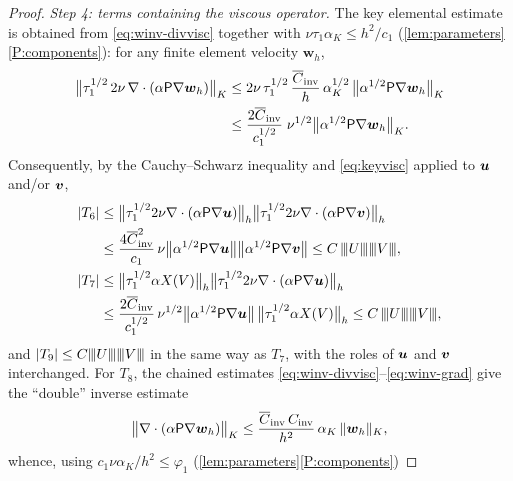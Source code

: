\begin{proof}
\medskip\noindent\emph{Step 4: terms containing the viscous operator.}
The key elemental estimate is obtained from \eqref{eq:winv-divvisc} together with
$\nu\tau_1\alpha_K\le h^2/c_1$ (\cref{lem:parameters}\ref{P:components}): for any finite
element velocity $\boldsymbol{w}_h$,
\begin{equation}\label{eq:keyvisc}
\begin{aligned}
  \bigl\lVert\tau_1^{1/2}\,2\nu\,
  \nabla\cdot(\alpha\mathsf{P}\nabla\boldsymbol{w}_h)\bigr\rVert_{K}
  &\le 2\nu\,\tau_1^{1/2}\,\frac{\overline{C}_{\mathrm{inv}}}{h}\,\alpha_K^{1/2}\,
  \bigl\lVert\alpha^{1/2}\mathsf{P}\nabla\boldsymbol{w}_h\bigr\rVert_{K} \\
  &\le \frac{2\overline{C}_{\mathrm{inv}}}{c_1^{1/2}}\;\nu^{1/2}
  \bigl\lVert\alpha^{1/2}\mathsf{P}\nabla\boldsymbol{w}_h\bigr\rVert_{K}.
\end{aligned}
\end{equation}
Consequently, by the Cauchy--Schwarz inequality and \eqref{eq:keyvisc} applied to $\boldsymbol{u}$
and/or $\boldsymbol{v}$,
\begin{align}
  |T_6| &\le
  \bigl\lVert\tau_1^{1/2}2\nu\nabla\cdot(\alpha\mathsf{P}\nabla\boldsymbol{u})\bigr\rVert_h
  \bigl\lVert\tau_1^{1/2}2\nu\nabla\cdot(\alpha\mathsf{P}\nabla\boldsymbol{v})\bigr\rVert_h \nonumber\\
  &\le \frac{4\overline{C}_{\mathrm{inv}}^2}{c_1}\,
  \nu\bigl\lVert\alpha^{1/2}\mathsf{P}\nabla\boldsymbol{u}\bigr\rVert
  \bigl\lVert\alpha^{1/2}\mathsf{P}\nabla\boldsymbol{v}\bigr\rVert
  \le C\,{\lvert\kern-0.25ex\lvert\kern-0.25ex\lvert U \rvert\kern-0.25ex\rvert\kern-0.25ex\rvert}{\lvert\kern-0.25ex\lvert\kern-0.25ex\lvert V \rvert\kern-0.25ex\rvert\kern-0.25ex\rvert}, \label{eq:T6bound}\\
  |T_7| &\le
  \bigl\lVert\tau_1^{1/2}\alpha X(V)\bigr\rVert_h
  \bigl\lVert\tau_1^{1/2}2\nu\nabla\cdot(\alpha\mathsf{P}\nabla\boldsymbol{u})\bigr\rVert_h \nonumber\\
  &\le \frac{2\overline{C}_{\mathrm{inv}}}{c_1^{1/2}}\,
  \nu^{1/2}\bigl\lVert\alpha^{1/2}\mathsf{P}\nabla\boldsymbol{u}\bigr\rVert\,
  \bigl\lVert\tau_1^{1/2}\alpha X(V)\bigr\rVert_h
  \le C\,{\lvert\kern-0.25ex\lvert\kern-0.25ex\lvert U \rvert\kern-0.25ex\rvert\kern-0.25ex\rvert}{\lvert\kern-0.25ex\lvert\kern-0.25ex\lvert V \rvert\kern-0.25ex\rvert\kern-0.25ex\rvert}, \label{eq:T7bound}
\end{align}
and $|T_9|\le C{\lvert\kern-0.25ex\lvert\kern-0.25ex\lvert U \rvert\kern-0.25ex\rvert\kern-0.25ex\rvert}{\lvert\kern-0.25ex\lvert\kern-0.25ex\lvert V \rvert\kern-0.25ex\rvert\kern-0.25ex\rvert}$ in the same way as $T_7$, with the roles of
$\boldsymbol{u}$ and $\boldsymbol{v}$ interchanged. For $T_8$, the chained estimates
\eqref{eq:winv-divvisc}--\eqref{eq:winv-grad} give the ``double'' inverse estimate
\begin{equation}\label{eq:doubleinv}
  \bigl\lVert\nabla\cdot(\alpha\mathsf{P}\nabla\boldsymbol{w}_h)\bigr\rVert_{K}
  \le \frac{\overline{C}_{\mathrm{inv}}\,C_{\mathrm{inv}}}{h^2}\,\alpha_K\,\lVert\boldsymbol{w}_h\rVert_{K},
\end{equation}
whence, using $c_1\nu\alpha_K/h^2\le\varphi_1$ (\cref{lem:parameters}\ref{P:components})

\end{proof}
